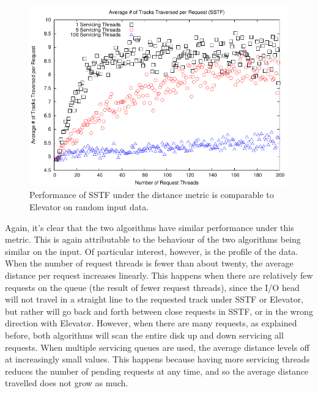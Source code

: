 \documentclass{report}
\begin{document}
\begin{figure}[htb!]
    \centering
    \includegraphics[scale=1]{distanceSSTF.pdf}
    \caption{Performance of SSTF under the distance metric is comparable to Elevator on
    random input data.}
    \label{fig:distanceSSTF}
\end{figure}
\newpage
Again, it's clear that the two algorithms have similar performance under this metric. This
is again attributable to the behaviour of the two algorithms being similar on the input.
Of particular interest, however, is the profile of the data. When the number of request
threads is fewer than about twenty, the average distance per request increases linearly.
This happens when there are relatively few requests on the queue
(the result of fewer request threads), since the I/O head will not travel in a straight line to
the requested track under SSTF or Elevator, but rather will go back and forth between
close requests in SSTF, or in the wrong direction with Elevator. However, when there are
many requests, as explained before, both algorithms will scan the entire disk up and down
servicing all requests. When multiple servicing queues are used, the average distance 
levels off at increasingly
small values. This happens because having more servicing threads reduces the number of
pending requests at any time, and so the average distance travelled does not grow as
much.
\end{document}
